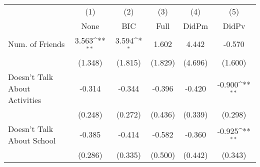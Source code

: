 {
\def\sym#1{\ifmmode^{#1}\else\(^{#1}\)\fi}
\begin{tabular}{l*{5}{c}}
\toprule
            &\multicolumn{1}{c}{(1)}&\multicolumn{1}{c}{(2)}&\multicolumn{1}{c}{(3)}&\multicolumn{1}{c}{(4)}&\multicolumn{1}{c}{(5)}\\
            &\multicolumn{1}{c}{None}&\multicolumn{1}{c}{BIC}&\multicolumn{1}{c}{Full}&\multicolumn{1}{c}{DidPm}&\multicolumn{1}{c}{DidPv}\\
\midrule
Num. of Friends&       3.563\sym{**} &       3.594\sym{*}  &       1.602         &       4.442         &      -0.570         \\
            &     (1.348)         &     (1.815)         &     (1.829)         &     (4.696)         &     (1.600)         \\
\addlinespace
Doesn't Talk About Activities&      -0.314         &      -0.344         &      -0.396         &      -0.420         &      -0.900\sym{**} \\
            &     (0.248)         &     (0.272)         &     (0.436)         &     (0.339)         &     (0.298)         \\
\addlinespace
Doesn't Talk About School&      -0.385         &      -0.414         &      -0.582         &      -0.360         &      -0.925\sym{**} \\
            &     (0.286)         &     (0.335)         &     (0.500)         &     (0.442)         &     (0.343)         \\
\bottomrule
\end{tabular}
}
